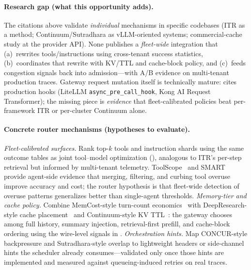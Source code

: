 \begin{opportunity}
\paragraph{Research gap (what this opportunity adds).}
The citations above validate \emph{individual} mechanisms in specific
codebases (ITR as a method; Continuum/Sutradhara as vLLM-oriented
systems; commercial-cache study at the provider API).  None publishes
a \emph{fleet-wide} integration that (a)~rewrites tools/instructions
using cross-tenant success statistics, (b)~coordinates that rewrite
with KV/TTL and cache-block policy, and (c)~feeds congestion signals
back into admission---with A/B evidence on multi-tenant production
traces.  Gateway request mutation itself is technically mature:
 cites production hooks (LiteLLM
\texttt{async\_pre\_call\_hook}, Kong AI Request Transformer); the
missing piece is \emph{evidence} that fleet-calibrated policies beat
per-framework ITR or per-cluster Continuum alone.

\paragraph{Concrete router mechanisms (hypotheses to evaluate).}
\textit{Fleet-calibrated surfaces.} Rank top-$k$ tools and instruction
shards using the same outcome tables as joint tool--model optimization
(), analogous to ITR's per-step retrieval but
informed by multi-tenant telemetry.  ToolScope~\cite{toolscope2025}
and SMART~\cite{smart2026} provide agent-side evidence that merging,
filtering, and curbing tool overuse improve accuracy and cost; the
router hypothesis is that fleet-wide detection of overuse patterns
generalizes better than single-agent thresholds.
\textit{Memory-tier and cache policy.} Combine MemCost-style
turn-count economics~\cite{memcost2026} with DeepResearch-style cache
placement~\cite{dontbreakcache2026} and Continuum-style KV
TTL~\cite{continuum2025}: the gateway chooses among full history,
summary injection, retrieval-first prefill, and cache-block ordering
using the wire-level signals in .
\textit{Orchestration hints.} Map CONCUR-style backpressure and
Sutradhara-style overlap to lightweight headers or side-channel hints
the scheduler already consumes---validated only once those hints are
implemented and measured against queueing-induced retries on real
traces.


\end{opportunity}
